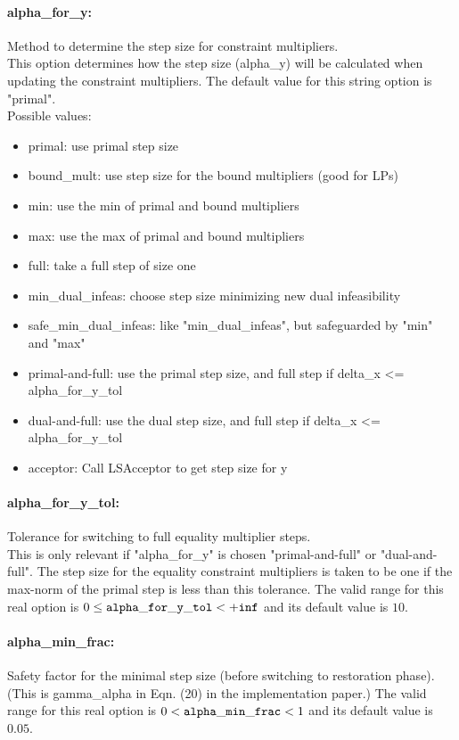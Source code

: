 \paragraph{alpha\_for\_y:}\label{sec:alpha_for_y} Method to determine the step size for constraint multipliers. $\;$ \\
 This option determines how the step size
(alpha\_y) will be calculated when updating the
constraint multipliers.
The default value for this string option is "primal".
\\ 
Possible values:
\begin{itemize}
   \item primal: use primal step size
   \item bound\_mult: use step size for the bound multipliers (good
for LPs)
   \item min: use the min of primal and bound multipliers
   \item max: use the max of primal and bound multipliers
   \item full: take a full step of size one
   \item min\_dual\_infeas: choose step size minimizing new dual
infeasibility
   \item safe\_min\_dual\_infeas: like "min\_dual\_infeas", but safeguarded by
"min" and "max"
   \item primal-and-full: use the primal step size, and full step if
delta\_x <= alpha\_for\_y\_tol
   \item dual-and-full: use the dual step size, and full step if
delta\_x <= alpha\_for\_y\_tol
   \item acceptor: Call LSAcceptor to get step size for y
\end{itemize}

\paragraph{alpha\_for\_y\_tol:}\label{sec:alpha_for_y_tol} Tolerance for switching to full equality multiplier steps. $\;$ \\
 This is only relevant if "alpha\_for\_y" is
chosen "primal-and-full" or "dual-and-full".  The
step size for the equality constraint multipliers
is taken to be one if the max-norm of the primal
step is less than this tolerance. The valid range for this real option is 
$0 \le {\tt alpha\_for\_y\_tol } <  {\tt +inf}$
and its default value is $10$.


\paragraph{alpha\_min\_frac:}\label{sec:alpha_min_frac} Safety factor for the minimal step size (before switching to restoration phase). $\;$ \\
 (This is gamma\_alpha in Eqn. (20) in the
implementation paper.) The valid range for this real option is 
$0 <  {\tt alpha\_min\_frac } <  1$
and its default value is $0.05$.


